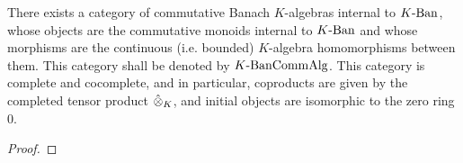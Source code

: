             \begin{corollary}
                There exists a category of commutative Banach $K$-algebras internal to $K\text{-}\mathrm{Ban}$, whose objects are the commutative monoids internal to $K\text{-}\mathrm{Ban}$ and whose morphisms are the continuous (i.e. bounded) $K$-algebra homomorphisms between them. This category shall be denoted by $K\text{-}\mathrm{Ban}\mathrm{Comm}\mathrm{Alg}$. This category is complete and cocomplete, and in particular, coproducts are given by the completed tensor product $\hattensor_K$, and initial objects are isomorphic to the zero ring $0$.
            \end{corollary}
                \begin{proof}
                    
                \end{proof}
            
